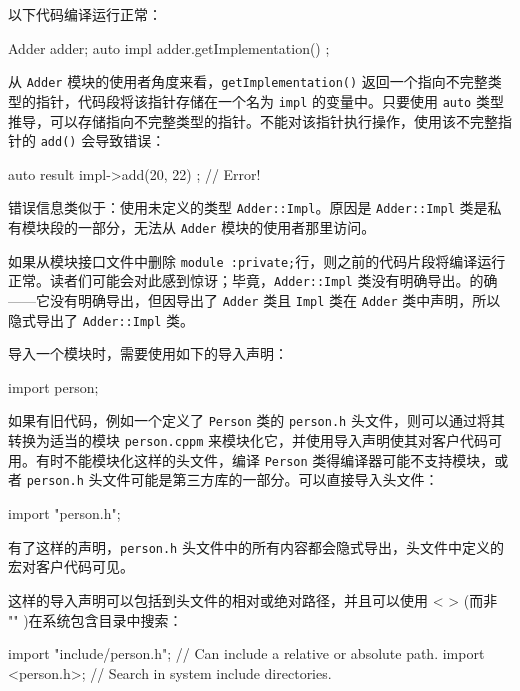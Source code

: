 以下代码编译运行正常：

\begin{cpp}
Adder adder;
auto impl { adder.getImplementation() };
\end{cpp}

从 \verb|Adder| 模块的使用者角度来看，\verb|getImplementation()| 返回一个指向不完整类型的指针，代码段将该指针存储在一个名为 \verb|impl| 的变量中。只要使用 \verb|auto| 类型推导，可以存储指向不完整类型的指针。不能对该指针执行操作，使用该不完整指针的 \verb|add()| 会导致错误：

\begin{cpp}
auto result { impl->add(20, 22) }; // Error!
\end{cpp}

错误信息类似于：使用未定义的类型 \verb|Adder::Impl|。原因是 \verb|Adder::Impl| 类是私有模块段的一部分，无法从 \verb|Adder| 模块的使用者那里访问。

如果从模块接口文件中删除 \verb|module :private;|行，则之前的代码片段将编译运行正常。读者们可能会对此感到惊讶；毕竟，\verb|Adder::Impl| 类没有明确导出。的确——它没有明确导出，但因导出了 \verb|Adder| 类且 \verb|Impl| 类在 \verb|Adder| 类中声明，所以隐式导出了 \verb|Adder::Impl| 类。


导入一个模块时，需要使用如下的导入声明：

\begin{cpp}
import person;
\end{cpp}

如果有旧代码，例如一个定义了 \verb|Person| 类的 \verb|person.h| 头文件，则可以通过将其转换为适当的模块 \verb|person.cppm| 来模块化它，并使用导入声明使其对客户代码可用。有时不能模块化这样的头文件，编译 \verb|Person| 类得编译器可能不支持模块，或者 \verb|person.h| 头文件可能是第三方库的一部分。可以直接导入头文件：

\begin{cpp}
import "person.h";
\end{cpp}

有了这样的声明，\verb|person.h| 头文件中的所有内容都会隐式导出，头文件中定义的宏对客户代码可见。

这样的导入声明可以包括到头文件的相对或绝对路径，并且可以使用 < > (而非 "" )在系统包含目录中搜索：

\begin{cpp}
import "include/person.h"; // Can include a relative or absolute path.
import <person.h>; // Search in system include directories.
\end{cpp}

